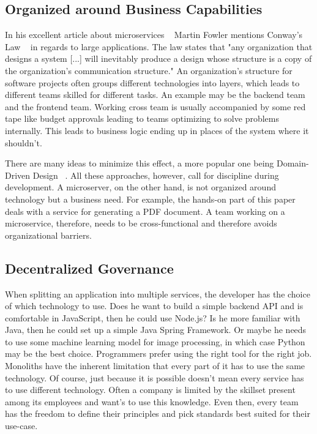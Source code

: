 \subsection{Organized around Business Capabilities}

In his excellent article about microservices ~\cite{microservices.2014} Martin Fowler mentions Conway's Law ~\cite{conway.1968} in regards to large applications. The law states that "any organization that designs a system [...] will inevitably produce a design whose structure is a copy of the organization's communication structure." An organization's structure for software projects often groups different technologies into layers, which leads to different teams skilled for different tasks. An example may be the backend team and the frontend team. Working cross team is usually accompanied by some red tape like budget approvals leading to teams optimizing to solve problems internally. This leads to business logic ending up in places of the system where it shouldn't.

There are many ideas to minimize this effect, a more popular one being Domain-Driven Design ~\cite{evans.2003}. All these approaches, however, call for discipline during development. A microserver, on the other hand, is not organized around technology but a business need. For example, the hands-on part of this paper deals with a service for generating a PDF document. A team working on a microservice, therefore, needs to be cross-functional and therefore avoids organizational barriers.


\subsection{Decentralized Governance}

When splitting an application into multiple services, the developer has the choice of which technology to use. Does he want to build a simple backend API and is comfortable in JavaScript, then he could use Node.js? Is he more familiar with Java, then he could set up a simple Java Spring Framework. Or maybe he needs to use some machine learning model for image processing, in which case Python may be the best choice. Programmers prefer using the right tool for the right job. Monoliths have the inherent limitation that every part of it has to use the same technology. Of course, just because it is possible doesn't mean every service has to use different technology. Often a company is limited by the skillset present among its employees and want's to use this knowledge. Even then, every team has the freedom to define their principles and pick standards best suited for their use-case.

